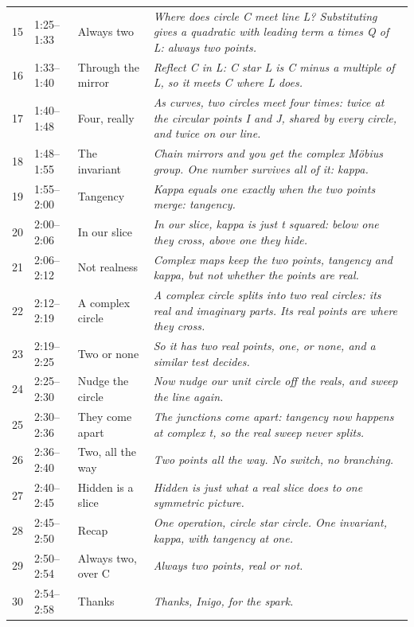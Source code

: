 \documentclass[10pt]{article}
\begin{document}
{\begin{longtable}{rllp{}}
15 & 1:25--1:33 & Always two & \emph{Where does circle C meet line L? Substituting gives a quadratic with leading term a times Q of L: always two points.}\\
16 & 1:33--1:40 & Through the mirror & \emph{Reflect C in L: C star L is C minus a multiple of L, so it meets C where L does.}\\
17 & 1:40--1:48 & Four, really & \emph{As curves, two circles meet four times: twice at the circular points I and J, shared by every circle, and twice on our line.}\\
18 & 1:48--1:55 & The invariant & \emph{Chain mirrors and you get the complex Möbius group. One number survives all of it: kappa.}\\
19 & 1:55--2:00 & Tangency & \emph{Kappa equals one exactly when the two points merge: tangency.}\\
20 & 2:00--2:06 & In our slice & \emph{In our slice, kappa is just t squared: below one they cross, above one they hide.}\\
21 & 2:06--2:12 & Not realness & \emph{Complex maps keep the two points, tangency and kappa, but not whether the points are real.}\\
22 & 2:12--2:19 & A complex circle & \emph{A complex circle splits into two real circles: its real and imaginary parts. Its real points are where they cross.}\\
23 & 2:19--2:25 & Two or none & \emph{So it has two real points, one, or none, and a similar test decides.}\\
24 & 2:25--2:30 & Nudge the circle & \emph{Now nudge our unit circle off the reals, and sweep the line again.}\\
25 & 2:30--2:36 & They come apart & \emph{The junctions come apart: tangency now happens at complex t, so the real sweep never splits.}\\
26 & 2:36--2:40 & Two, all the way & \emph{Two points all the way. No switch, no branching.}\\
27 & 2:40--2:45 & Hidden is a slice & \emph{Hidden is just what a real slice does to one symmetric picture.}\\
28 & 2:45--2:50 & Recap & \emph{One operation, circle star circle. One invariant, kappa, with tangency at one.}\\
29 & 2:50--2:54 & Always two, over C & \emph{Always two points, real or not.}\\
30 & 2:54--2:58 & Thanks & \emph{Thanks, Inigo, for the spark.}\\\bottomrule\end{longtable}}
\end{document}
